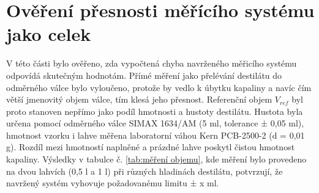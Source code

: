 \section{Ověření přesnosti měřícího systému jako celek}

V této části bylo ověřeno, zda vypočtená chyba navrženého měřicího systému odpovídá skutečným hodnotám. Přímé měření jako přelévání destilátu do odměrného válce bylo vyloučeno, protože by vedlo k úbytku kapaliny a navíc čím větší jmenovitý objem válce, tím klesá jeho přesnost. Referenční objem $V_{ref}$ byl proto stanoven nepřímo jako podíl hmotnosti a hustoty destilátu. Hustota byla určena pomocí odměrného válce SIMAX 1634/AM (5 ml, tolerance ± 0,05 ml), hmotnost vzorku i lahve měřena laboratorní váhou Kern PCB-2500-2 (d = 0,01 g). Rozdíl mezi hmotností naplněné a prázdné lahve poskytl čistou hmotnost kapaliny. Výsledky v tabulce č. \ref{tab:měření objemu}, kde měření bylo provedeno na dvou lahvích (0,5 l a 1 l) při různých hladinách destilátu, potvrzují, že navržený systém vyhovuje požadovanému limitu ± x ml.




